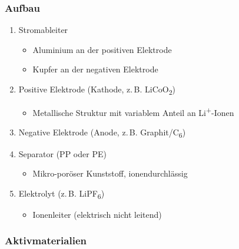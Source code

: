 \subsubsection{Aufbau}

\begin{enumerate}
  \item Stromableiter
  \begin{itemize}
    \item Aluminium an der positiven Elektrode
    \item Kupfer an der negativen Elektrode
  \end{itemize}
  
  \item Positive Elektrode (Kathode, z.\,B. LiCoO\textsubscript{2})
  \begin{itemize}
    \item Metallische Struktur mit \glqq variablem\grqq{} Anteil an Li\textsuperscript{+}-Ionen
  \end{itemize}
  
  \item Negative Elektrode (Anode, z.\,B. Graphit/C\textsubscript{6})
  
  \item Separator (PP oder PE)
  \begin{itemize}
    \item Mikro-poröser Kunststoff, ionendurchlässig
  \end{itemize}
  
  \item Elektrolyt (z.\,B. LiPF\textsubscript{6})
  \begin{itemize}
    \item Ionenleiter (elektrisch nicht leitend)
  \end{itemize}
\end{enumerate}



\subsubsection{Aktivmaterialien}

